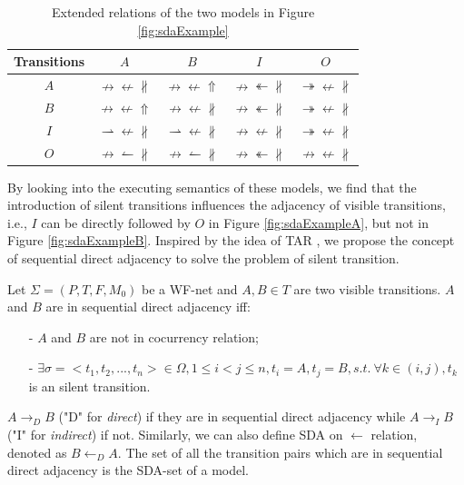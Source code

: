 \documentclass[dvips,...]{llncs}
\makeatletter
\newcommand\tabcaption{\def\@captype{table}\caption}
\makeatother
\begin{document}
\begin{table}[htbp]
\centering
\tabcaption{Extended relations of the two models in Figure \ref{fig:sdaExample}\label{tab:sdaExample}}
\begin{tabular}{c|c|c|c|c} \hline
	Transitions & $A$ & $B$ & $I$ & $O$\\ \hline
	$A$
		& $\nrightarrow\nleftarrow\nparallel$
		& $\nrightarrow\nleftarrow\Uparrow$
		& $\nrightarrow\twoheadleftarrow\nparallel$
		& $\twoheadrightarrow\nleftarrow\nparallel$
		\\ \hline
	$B$
		& $\nrightarrow\nleftarrow\Uparrow$
		& $\nrightarrow\nleftarrow\nparallel$
		& $\nrightarrow\twoheadleftarrow\nparallel$
		& $\twoheadrightarrow\nleftarrow\nparallel$
		\\ \hline
	$I$
		& $\rightharpoonup\nleftarrow\nparallel$
		& $\rightharpoonup\nleftarrow\nparallel$
		& $\nrightarrow\nleftarrow\nparallel$
		& $\twoheadrightarrow\nleftarrow\nparallel$
		\\ \hline
	$O$
		& $\nrightarrow\leftharpoonup\nparallel$
		& $\nrightarrow\leftharpoonup\nparallel$
		& $\nrightarrow\twoheadleftarrow\nparallel$
		& $\nrightarrow\nleftarrow\nparallel$
		\\ \hline
\end{tabular}
\end{table}

By looking into the executing semantics of these models, we find that the introduction of silent transitions influences the adjacency of visible transitions, i.e., $I$ can be directly followed by $O$ in Figure \ref{fig:sdaExampleA}, but not in Figure \ref{fig:sdaExampleB}. Inspired by the idea of TAR \cite{zha2010workflow}, we propose the concept of sequential direct adjacency to solve the problem of silent transition.

\begin{definition}\label{def:sda}
Let $\Sigma=(P,T,F,M_{0})$ be a WF-net and $A,B\in T$ are two visible transitions. $A$ and $B$ are in sequential direct adjacency iff:
	\begin{itemize}
		\item[-] $A$ and $B$ are not in cocurrency relation;
		\item[-] $\exists\sigma=<t_{1},t_{2},...,t_{n}>\in\Omega,1\leq i<j\leq n,t_{i}=A,t_{j}=B,s.t.~\forall k\in(i,j),t_{k}$ is an silent transition.
	\end{itemize}
$A\rightarrow_{D}B$ ("D" for \textit{direct}) if they are in sequential direct adjacency while $A\rightarrow_{I}B$ ("I" for \textit{indirect}) if not. Similarly, we can also define SDA on $\leftarrow$ relation, denoted as $B\leftarrow_{D}A$. The set of all the transition pairs which are in sequential direct adjacency is the SDA-set of a model.
\end{definition}
\end{document}
